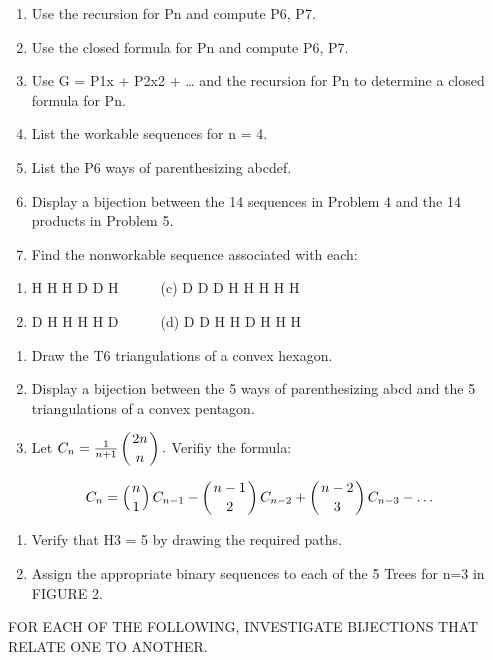 \documentclass{article}
\begin{document}
\begin{enumerate}
\item Use the recursion for Pn and compute P6, P7.
\item Use the closed formula for Pn and compute P6, P7.
\item Use G = P1x + P2x2 + … and the recursion for Pn to determine a closed formula for Pn.
\item List the workable sequences for n = 4.
\item List the P6 ways of parenthesizing abcdef.
\item Display a bijection between the 14 sequences in Problem 4 and the 14 products in Problem 5.
\item Find the nonworkable sequence associated with each:
\end{enumerate}
\begin{enumerate}
\item H H H D D H\ \ \ \ \ \ (c) D D D H H H H H
\item D H H H H D\ \ \ \ \ \ (d) D D H H D H H H\ \ \ \ \ \ 
\end{enumerate}
\begin{enumerate}
\item Draw the T6 triangulations of a convex hexagon.
\item Display a bijection between the 5 ways of parenthesizing abcd and the 5 triangulations of a convex pentagon.
\item Let  $C_n=\frac 1{n+1}\left(\genfrac{}{}{0pt}{0}{2n}n\right).$ Verifiy the formula:
\end{enumerate}
\begin{equation*}
C_n=\left(\genfrac{}{}{0pt}{0}n1\right)C_{n-1}-\left(\genfrac{}{}{0pt}{0}{n-1}2\right)C_{n-2}+\left(\genfrac{}{}{0pt}{0}{n-2}3\right)C_{n-3}-{\dots}
\end{equation*}
\begin{enumerate}
\item Verify that H3 = 5 by drawing the required paths.
\item Assign the appropriate binary sequences to each of the 5 Trees for n=3 in FIGURE 2.
\end{enumerate}
FOR EACH OF THE FOLLOWING, INVESTIGATE BIJECTIONS THAT RELATE ONE TO ANOTHER.
\end{document}
